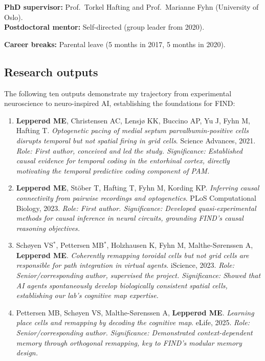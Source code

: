 \noindent\textbf{PhD supervisor:} Prof.\ Torkel Hafting and Prof.\ Marianne Fyhn (University of Oslo). \\
\textbf{Postdoctoral mentor:} Self-directed (group leader from 2020).

\noindent\textbf{Career breaks:} Parental leave (5 months in 2017, 5 months in 2020).

\subsection*{Research outputs}

The following ten outputs demonstrate my trajectory from experimental neuroscience to neuro-inspired AI, establishing the foundations for FIND:

\begin{enumerate}[noitemsep,topsep=2pt]
  \item \textbf{Lepperød ME}, Christensen AC, Lensjø KK, Buccino AP, Yu J, Fyhn M, Hafting T. \textit{Optogenetic pacing of medial septum parvalbumin-positive cells disrupts temporal but not spatial firing in grid cells}. Science Advances, 2021.
  \textit{Role: First author, conceived and led the study. Significance: Established causal evidence for temporal coding in the entorhinal cortex, directly motivating the temporal predictive coding component of PAM.}

  \item \textbf{Lepperød ME}, Stöber T, Hafting T, Fyhn M, Kording KP. \textit{Inferring causal connectivity from pairwise recordings and optogenetics}. PLoS Computational Biology, 2023.
  \textit{Role: First author. Significance: Developed quasi-experimental methods for causal inference in neural circuits, grounding FIND's causal reasoning objectives.}

  \item Schøyen VS$^*$, Pettersen MB$^*$, Holzhausen K, Fyhn M, Malthe-Sørenssen A, \textbf{Lepperød ME}. \textit{Coherently remapping toroidal cells but not grid cells are responsible for path integration in virtual agents}. iScience, 2023.
  \textit{Role: Senior/corresponding author, supervised the project. Significance: Showed that AI agents spontaneously develop biologically consistent spatial cells, establishing our lab's cognitive map expertise.}

  \item Pettersen MB, Schøyen VS, Malthe-Sørenssen A, \textbf{Lepperød ME}. \textit{Learning place cells and remapping by decoding the cognitive map}. eLife, 2025.
  \textit{Role: Senior/corresponding author. Significance: Demonstrated context-dependent memory through orthogonal remapping, key to FIND's modular memory design.}


\end{enumerate}
